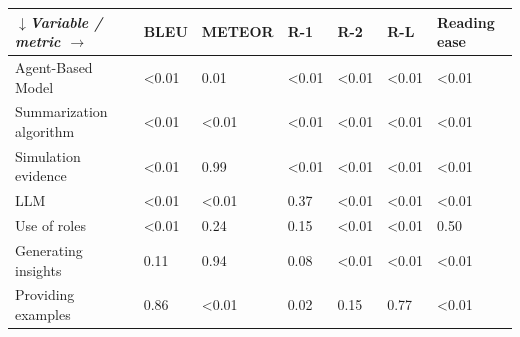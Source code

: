 \begin{tabular}{|l|l|l|l|l|l|l|}
\hline
\textit{$\downarrow$Variable / metric $\rightarrow$} & BLEU & METEOR & R-1 & R-2 & R-L & Reading ease \\
 \hline
 Agent-Based Model & \textless{}0.01 & 0.01 & \textless{}0.01 & \textless{}0.01 & \textless{}0.01 & \textless{}0.01 \\
 \hline
 Summarization algorithm & \textless{}0.01 & \textless{}0.01 & \textless{}0.01 & \textless{}0.01 & \textless{}0.01 & \textless{}0.01 \\
 \hline
 Simulation evidence & \textless{}0.01 & 0.99 & \textless{}0.01 & \textless{}0.01 & \textless{}0.01 & \textless{}0.01 \\
 \hline
 LLM & \textless{}0.01 & \textless{}0.01 & 0.37 & \textless{}0.01 & \textless{}0.01 & \textless{}0.01 \\
 \hline
 Use of roles & \textless{}0.01 & 0.24 & 0.15 & \textless{}0.01 & \textless{}0.01 & 0.50 \\
 \hline
 Generating insights & 0.11 & 0.94 & 0.08 & \textless{}0.01 & \textless{}0.01 & \textless{}0.01 \\
 \hline
 Providing examples & 0.86 & \textless{}0.01 & 0.02 & 0.15 & 0.77 & \textless{}0.01 \\
\hline
\end{tabular}
